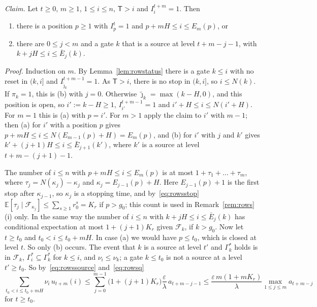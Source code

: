 \documentclass[11pt]{amsart}
\theoremstyle{definition}
\theoremstyle{remark}
\newcommand{\eps}{\varepsilon}
\newcommand{\jt}{\tilde{\jmath}}
\newcommand{\EE}{\mathbb{E}}
\newcommand{\cF}{\mathcal{F}}
\begin{document}
\emph{Claim.} Let $t\ge0$, $m\ge1$, $1\le i\le n$, $\mathsf T>i$ and $I^{t+m}_i=1$. Then
\begin{enumerate}[label=(\alph*),leftmargin=2.4em]
\item there is a position $p\ge1$ with $I^t_p=1$ and $p+mH\le i\le E_m(p)$, or
\item there are $0\le j<m$ and a gate $k$ that is a source at level $t+m-j-1$, with
$k+jH\le i\le\bar E_j(k)$.
\end{enumerate}
\emph{Proof.} Induction on $m$. By Lemma~\ref{lem:rowstatus} there is a gate $k\le i$ with no reset
in $(k,i]$ and $I^{t+m-1}_{\jt_k}=1$. As $\mathsf T>i$, there is no stop in $(k,i]$, so
$i\le N(k)$. If $\pi_k=1$, this is (b) with $j=0$. Otherwise $\jt_k=\max(k-H,0)$, and this
position is open, so $i':=k-H\ge1$, $I^{t+m-1}_{i'}=1$ and $i'+H\le i\le N(i'+H)$. For $m=1$ this
is (a) with $p=i'$. For $m>1$ apply the claim to $i'$ with $m-1$; then (a) for $i'$ with a
position $p$ gives $p+mH\le i\le N(E_{m-1}(p)+H)=E_m(p)$, and (b) for $i'$ with $j$ and $k'$ gives
$k'+(j+1)H\le i\le\bar E_{j+1}(k')$, where $k'$ is a source at level $t+m-(j+1)-1$.

The number of $i\le n$ with $p+mH\le i\le E_m(p)$ is at most $1+\tau_1+\dots+\tau_m$, where
$\tau_j=N(\kappa_j)-\kappa_j$ and $\kappa_j=E_{j-1}(p)+H$. Here $E_{j-1}(p)+1$ is the first stop
after $\kappa_{j-1}$, so $\kappa_j$ is a stopping time, and by~\eqref{eq:rowsstop}
$\EE[\tau_j\mid\cF_{\kappa_j}]\le\sum_{s\ge1}r_0^s=K_r$ if $p>g_0$; this count is used in
Remark~\ref{rem:rows}(i) only. In the same way the number of
$i\le n$ with $k+jH\le i\le\bar E_j(k)$ has conditional expectation at most $1+(j+1)K_r$ given
$\cF_k$, if $k>g_0$. Now let $t\ge t_0$ and $t_0<i\le t_0+mH$. In case (a) we would have
$p\le t_0$, which is closed at level $t$. So only (b) occurs. The event that $k$ is a source at
level $t'$ and $\Gamma^*_k$ holds is in $\cF_k$, $\Gamma^*_i\subseteq\Gamma^*_k$ for $k\le i$, and
$\nu_i\le\nu_k$; a gate $k\le t_0$ is not a source at a level $t'\ge t_0$. So
by~\eqref{eq:rowssource} and~\eqref{eq:rowsq}
\begin{equation}\label{eq:rowsearly}
\sum_{t_0<i\le t_0+mH}\!\!\nu_i\,u_{t+m}(i)\le\sum_{j=0}^{m-1}\bigl(1+(j+1)K_r\bigr)\frac{\eps}{\lambda}\,a_{t+m-j-1}
\le\frac{\eps\,m(1+mK_r)}{\lambda}\max_{1\le j\le m}a_{t+m-j}
\end{equation}
for $t\ge t_0$.
\end{document}
